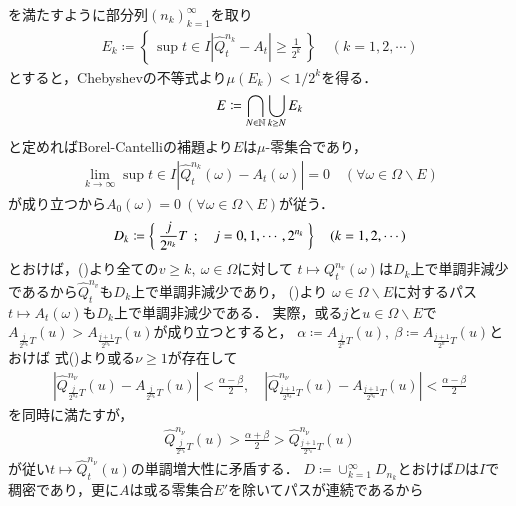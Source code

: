 \begin{prf}
\begin{description}
				を満たすように部分列$(n_k)_{k=1}^{\infty}$を取り
				\begin{align}
					E_k \coloneqq \left\{\, \sup{t \in I}{\left| \hat{Q}_t^{n_k} - A_t \right|} \geq \frac{1}{2^k} \, \right\} \quad (k=1,2,\cdots)
				\end{align}
				とすると，Chebyshevの不等式より$\mu(E_k) < 1/2^k$を得る．
				\begin{align}
					E \coloneqq \bigcap_{N \in \mathbb{N}} \bigcup_{k \geq N} E_k
				\end{align}
				と定めればBorel-Cantelliの補題より$E$は$\mu$-零集合であり，
				\begin{align}
					\lim_{k \to \infty}\sup{t \in I}{\left| \hat{Q}_t^{n_k}(\omega) - A_t(\omega) \right|} = 0 
					\quad (\forall \omega \in \Omega \backslash E)
					\label{eq:thm_quadratic_variation_1}
				\end{align}
				が成り立つから$A_0(\omega) = 0 \ (\forall \omega \in \Omega \backslash E)$が従う．
				\begin{align}
					D_k \coloneqq \left\{\ \frac{j}{2^{n_k}}T\ \, ; \quad  j = 0,1,\cdots,2^{n_k} \ \right\} \quad (k=1,2,\cdots)
				\end{align}
				とおけば，()より全ての$v \geq k,\ \omega \in \Omega$に対して
				$t \longmapsto Q_t^{n_v}(\omega)$は$D_k$上で単調非減少であるから$\hat{Q}_t^{n_v}$も$D_k$上で単調非減少であり，
				()より
				$\omega \in \Omega \backslash E$に対するパス$t \longmapsto A_t(\omega)$も$D_k$上で単調非減少である．
				実際，或る$j$と$u \in \Omega \backslash E$で$A_{\frac{j}{2^{n_k}}T}(u) > A_{\frac{j+1}{2^{n_k}}T}(u)$が成り立つとすると，
				$\alpha \coloneqq A_{\frac{j}{2^n}T}(u),\ \beta \coloneqq A_{\frac{j+1}{2^n}T}(u)$とおけば
				式()より或る$\nu \geq 1$が存在して
				\begin{align}
					\left| \hat{Q}_{\frac{j}{2^{n_k}}T}^{n_\nu}(u) - A_{\frac{j}{2^{n_k}}T}(u) \right| < \frac{\alpha - \beta}{2},
					\quad \left| \hat{Q}_{\frac{j+1}{2^{n_k}}T}^{n_\nu}(u) - A_{\frac{j+1}{2^{n_k}}T}(u) \right| < \frac{\alpha - \beta}{2}
				\end{align}
				を同時に満たすが，
				\begin{align}
					\hat{Q}_{\frac{j}{2^{n_k}}T}^{n_\nu}(u) > \frac{\alpha + \beta}{2} > \hat{Q}_{\frac{j+1}{2^{n_k}}T}^{n_\nu}(u)
				\end{align}
				が従い$t \longmapsto \hat{Q}_t^{n_\nu}(u)$の単調増大性に矛盾する．
				$D \coloneqq \cup_{k=1}^{\infty} D_{n_k}$とおけば$D$は$I$で稠密であり，更に$A$は或る零集合$E'$を除いてパスが連続であるから

\end{description}
\end{prf}
